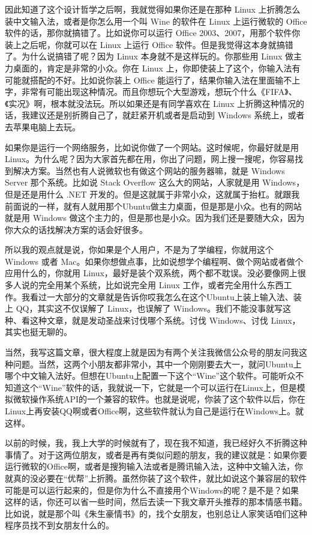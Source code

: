 \documentclass[
  letterpaper,
  DIV=11,
  numbers=noendperiod]{scrreprt}
\begin{document}
因此知道了这个设计哲学之后啊，我就觉得如果你还是在那种 Linux
上折腾怎么装中文输入法，或者是你怎么用一个叫 Wine 的软件在 Linux
上运行微软的 Office 软件的话，那你就搞错了。比如说你可以运行 Office
2003、2007，用那个软件你装上之后呢，你就可以在 Linux 上运行 Office
软件。但是我觉得这本身就搞错了。为什么说搞错了呢？因为 Linux
本身就不是这样玩的。你那些用 Linux 做主力桌面的，肯定是非常的小众。你在
Linux 上，你即使装上了这个，你输入法有可能就搭配的不好。比如说你装上
Office
能运行了，结果你输入法在里面输不上字，非常有可能出现这种情况。而且你想玩个大型游戏，想玩个什么《FIFA》、《实况》啊，根本就没法玩。所以如果还是有同学喜欢在
Linux 上折腾这种情况的话，我建议还是别折腾自己了，就赶紧开机或者是启动到
Windows 系统上，或者去苹果电脑上去玩。

如果你是运行一个网络服务，比如说你做了一个网站。这时候呢，你最好就是用
Linux。为什么呢？因为大家首先都在用，你出了问题，网上搜一搜呢，你容易找到解决方案。当然也有人说微软也有做这个网站的服务器嘛，就是
Windows Server 那个系统。比如说 Stack Overflow 这么大的网站，人家就是用
Windows，但是还是用什么 .NET
开发的。但是这就属于非常小众，这就属于抬杠。就跟我前面说的一样，就有人就用那个Ubuntu做主力桌面，但是那是小众。也有的网站就是用
Windows
做这个主力的，但是那也是小众。因为我们还是要随大众，因为你大众的话找解决方案的话会好很多。

所以我的观点就是说，你如果是个人用户，不是为了学编程，你就用这个 Windows
或者
Mac。如果你想做点事，比如说想学个编程啊、做个网站或者做个应用什么的，你就用
Linux，最好是装个双系统，两个都不耽误。没必要像网上很多人说的完全用某个系统，比如说完全用
Linux
工作，或者完全用什么东西工作。我看过一大部分的文章就是告诉你哎我怎么在这个Ubuntu上装上输入法、装上
QQ，其实这不仅误解了 Linux，也误解了
Windows。我们不能没事就写这种、看这种文章，就是发动圣战来讨伐哪个系统。讨伐
Windows、讨伐 Linux，其实也挺无聊的。

当然，我写这篇文章，很大程度上就是因为有两个关注我微信公众号的朋友问我这种问题。当然，这两个小朋友都非常小，其中一个刚刚要去大一，就问Ubuntu上哪个中文输入法好。但想在Ubuntu上配置一下这个``Wine''这个软件。可能听众不知道这个``Wine''软件的话，我就说一下，它就是一个可以运行在Linux上，但是模拟微软操作系统API的一个兼容的软件。也就是说呢，你装了这个软件以后，你在Linux上再安装QQ啊或者Office啊，这些软件就认为自己是运行在Windows上。就这样。

以前的时候，我，我上大学的时候就有了，现在我不知道，我已经好久不折腾这种事情了。对于这两位朋友，或者是再有类似问题的朋友，我的建议就是：如果你要运行微软的Office啊，或者是搜狗输入法或者是腾讯输入法，这种中文输入法，你就真的没必要在``优帮''上折腾。虽然你装了这个软件，就比如说这个兼容层的软件可能是可以运行起来的，但是你为什么不直接用个Windows的呢？是不是？如果这样的话，你还可以省一些时间，然后去读一下我文章开头推荐的那本情感书籍。比如说，就是那个叫《朱生豪情书》的，找个女朋友，也别总让人家笑话咱们这种程序员找不到女朋友什么的。
\end{document}
